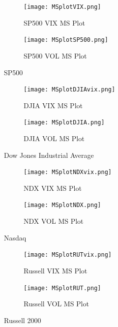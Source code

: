 \documentclass[11pt,a4paper,oldfontcommands]{memoir}
\begin{document}
{\begin{figure}[H]
\centering
\begin{subfigure}{.5\textwidth}
  \centering
  \texttt{[image: MSplotVIX.png]}
  \caption{SP500 VIX MS Plot}
  \label{fig:sub1}
\end{subfigure}%
\begin{subfigure}{.5\textwidth}
  \centering
  \texttt{[image: MSplotSP500.png]}
  \caption{SP500 VOL MS Plot}
  \label{fig:sub2}
\end{subfigure}
\caption{SP500}
\label{fig:maxsumratio1}
\end{figure}

\begin{figure}[H]
\centering
\begin{subfigure}{.5\textwidth}
  \centering
  \texttt{[image: MSplotDJIAvix.png]}
  \caption{DJIA VIX MS Plot}
  \label{fig:sub1}
\end{subfigure}%
\begin{subfigure}{.5\textwidth}
  \centering
  \texttt{[image: MSplotDJIA.png]}
  \caption{DJIA VOL MS Plot}
  \label{fig:sub2}
\end{subfigure}
\caption{Dow Jones Industrial Average}
\label{fig:maxsumratio2}
\end{figure}


\begin{figure}[H]
\centering
\begin{subfigure}{.5\textwidth}
  \centering
  \texttt{[image: MSplotNDXvix.png]}
  \caption{NDX VIX MS Plot}
  \label{fig:sub1}
\end{subfigure}%
\begin{subfigure}{.5\textwidth}
  \centering
  \texttt{[image: MSplotNDX.png]}
  \caption{NDX VOL MS Plot}
  \label{fig:sub2}
\end{subfigure}
\caption{Nasdaq}
\label{fig:maxsumratio3}
\end{figure}


\begin{figure}[H]
\centering
\begin{subfigure}{.5\textwidth}
  \centering
  \texttt{[image: MSplotRUTvix.png]}
  \caption{Russell VIX MS Plot}
  \label{fig:sub1}
\end{subfigure}%
\begin{subfigure}{.5\textwidth}
  \centering
  \texttt{[image: MSplotRUT.png]}
  \caption{Russell VOL MS Plot}
  \label{fig:sub2}
\end{subfigure}
\caption{Russell 2000}
\label{fig:maxsumratio4}
\end{figure}


}
\end{document}
